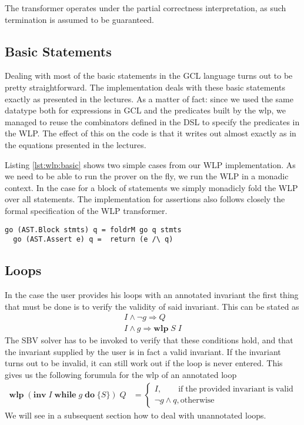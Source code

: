 \documentclass[]{scrartcl}
\newcommand{\IWHILE}[3]{\ensuremath{\mathbf{inv}\;#1\;\mathbf{while}\;#2\;\mathbf{do}\;\{#3\}}}
\newcommand{\WLP}[2]{\ensuremath{\mathbf{wlp}\;#1\;#2}}
\begin{document}
The transformer operates under the partial correctness interpretation, as such
termination is assumed to be guaranteed.

\subsection{Basic Statements}

Dealing with most of the basic statements in the GCL language turns out to
be pretty straightforward. The implementation deals with these basic statements
exactly as presented in the lectures.
As a matter of fact: since we used the same datatype both for expressions in GCL
and the predicates built by the wlp, we managed to reuse the combinators defined
in the DSL to specify the predicates in the WLP. The effect of this on the code
is that it writes out almost exactly as in the equations presented in the lectures.

Listing \ref{lst:wlp:basic} shows two simple cases from our WLP implementation.
As we need to be able to run the prover on the fly, we run the WLP in a monadic context.
In the case for a block of statements we simply monadicly fold the WLP over all statements.
The implementation for assertions also follows closely the formal specification of the
WLP transformer. 

\begin{lstlisting}[caption=WLP implementation example, label=lst:wlp:basic]
  go (AST.Block stmts) q = foldrM go q stmts
  go (AST.Assert e) q =  return (e /\ q)
\end{lstlisting}

\subsection{Loops}

In the case the user provides his loops with an annotated invariant the first
thing that must be done is to verify the validity of said invariant.
This can be stated as
\begin{align}
  I \land \neg g \Rightarrow Q \\
  I \land g \Rightarrow \WLP{S}{I}
\end{align}
The SBV solver has to be invoked to verify that these conditions hold, and that
the invariant supplied by the user is in fact a valid invariant.
If the invariant turns out to be invalid, it can still work out if the loop
is never entered. This gives us the following forumula for the wlp of an annotated
loop
\begin{align}
  \WLP{(\IWHILE{I}{g}{S})}{Q} &=
    \begin{cases}
      I, \qquad  \mathrm{if \; the \; provided \; invariant \; is \; valid}\\
      \neg g \land q, \mathrm{otherwise}
    \end{cases}
\end{align}
We will see in a subsequent section how to deal with unannotated loops.
\end{document}

